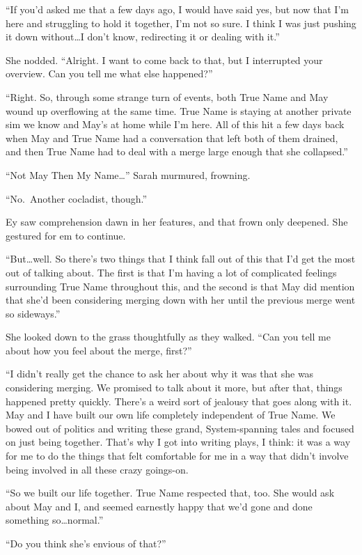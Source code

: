 ``If you'd asked me that a few days ago, I would have said yes, but now that I'm here and struggling to hold it together, I'm not so sure. I think I was just pushing it down without\ldots I don't know, redirecting it or dealing with it.''

She nodded. ``Alright. I want to come back to that, but I interrupted your overview. Can you tell me what else happened?''

``Right. So, through some strange turn of events, both True Name and May wound up overflowing at the same time. True Name is staying at another private sim we know and May's at home while I'm here. All of this hit a few days back when May and True Name had a conversation that left both of them drained, and then True Name had to deal with a merge large enough that she collapsed.''

``Not May Then My Name\ldots{}'' Sarah murmured, frowning.

``No.~Another cocladist, though.''

Ey saw comprehension dawn in her features, and that frown only deepened. She gestured for em to continue.

``But\ldots well. So there's two things that I think fall out of this that I'd get the most out of talking about. The first is that I'm having a lot of complicated feelings surrounding True Name throughout this, and the second is that May did mention that she'd been considering merging down with her until the previous merge went so sideways.''

She looked down to the grass thoughtfully as they walked. ``Can you tell me about how you feel about the merge, first?''

``I didn't really get the chance to ask her about why it was that she was considering merging. We promised to talk about it more, but after that, things happened pretty quickly. There's a weird sort of jealousy that goes along with it. May and I have built our own life completely independent of True Name. We bowed out of politics and writing these grand, System-spanning tales and focused on just being together. That's why I got into writing plays, I think: it was a way for me to do the things that felt comfortable for me in a way that didn't involve being involved in all these crazy goings-on.

``So we built our life together. True Name respected that, too. She would ask about May and I, and seemed earnestly happy that we'd gone and done something so\ldots normal.''

``Do you think she's envious of that?''

